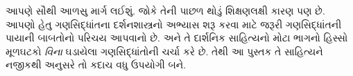 \documentclass[../../../include/open-logic-section]{subfiles}
\begin{document}
આપણે સૌથી આળસુ માર્ગ લઈશું. જોકે તેની પાછળ થોડું શિક્ષણલક્ષી
કારણ પણ છે. આપણો હેતુ ગણસિદ્ધાંતના દર્શનશાસ્ત્રનો અભ્યાસ શરૂ
કરવા માટે જરૂરી ગણસિદ્ધાંતની પાયાની બાબતોનો પરિચય આપવાનો છે.
અને તે દાર્શનિક સાહિત્યનો મોટા ભાગનો હિસ્સો મૂળઘટકો
\emph{વિના} ઘડાયેલા ગણસિદ્ધાંતોની ચર્ચા કરે છે. તેથી આ પુસ્તક
તે સાહિત્યને નજીકથી અનુસરે તો કદાચ વધુ ઉપયોગી બને.
\end{document}

